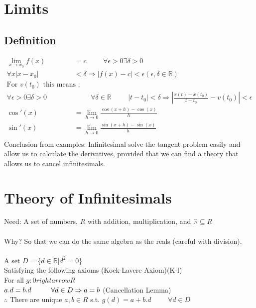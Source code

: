 \documentclass[a4paper,12pt]{article}
\begin{document}
\section*{Limits}
\subsection*{Definition}
\begin{align*}
\lim_{x \to x_0} f(x)& = c \hspace{1cm} \forall \epsilon > 0 \exists \delta > 0 \\
\forall x |x-x_0| & < \delta \Rightarrow |f(x)-c|< \epsilon (\epsilon, \delta \in \mathbb{R}) \\
\text{For } v(t_0) \text{ this means }: \\
\forall \epsilon > 0 \exists \delta > 0 &  \hspace{1cm} \forall \delta \in \mathbb{R} \hspace{1cm} |t-t_0| < \delta \Rightarrow | \frac{x(t) - x(t_0)}{t - t_0} - v(t_0) | < \epsilon
\\
\cos'(x) & = \lim_{h \to 0} \frac{\cos(x+h) - \cos(x)}{h} \\
\sin'(x) & = \lim_{h \to 0} \frac{\sin(x+h) - \sin(x)}{h} \\
\end{align*}
Conclusion from examples: Infinitesimal solve the tangent problem easily and allow us to calculate the derivatives, provided that we can find a theory that allows us to cancel infinitesimals. 
\section*{Theory of Infinitesimals}
Need: A set of numbers, $R$ with addition, multiplication, and $\mathbb{R} \subseteq R$\\\\
Why? So that we can do the same algebra as the reals (careful with division). \\\\
A set $D = \{d\in\mathbb{R} | d^2 = 0\}$ \\
Satisfying the following axioms (Kock-Lavere Axiom)(K-l) \\
For all $g: 0 rightarrow R$ \\
$a.d=b.d \hspace{1cm} \forall d \in D \\ \Rightarrow a = b $ (Cancellation Lemma) \\
$\therefore$ There are unique $a,b\in R$ s.t. $g(d) = a+b.d \hspace{1cm} \forall d \in D$ \\
\end{document}
